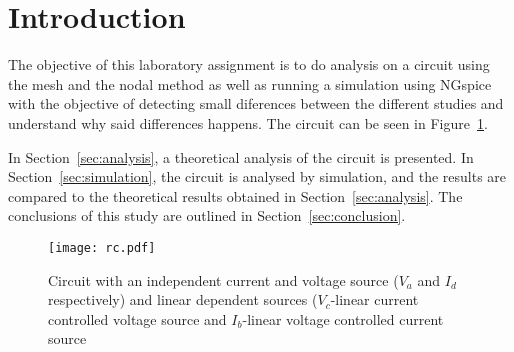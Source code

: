 \section{Introduction}
\label{sec:introduction}

The objective of this laboratory assignment is to do analysis on a circuit using the mesh and the nodal method as well as running a simulation using NGspice with the objective of detecting small diferences between the different studies and understand why said differences happens. The circuit can be seen in Figure~\ref{fig:rc}.

In Section~\ref{sec:analysis}, a theoretical analysis of the circuit is
presented. In Section~\ref{sec:simulation}, the circuit is analysed by
simulation, and the results are compared to the theoretical results obtained in
Section~\ref{sec:analysis}. The conclusions of this study are outlined in
Section~\ref{sec:conclusion}.

\begin{figure}[h] \centering
\texttt{[image: rc.pdf]}
\caption{Circuit with an independent current and voltage source ($V_a$ and $I_d$ respectively) and linear dependent sources ($V_c$-linear current controlled voltage source and $I_b$-linear voltage controlled current source}
\label{fig:rc}
\end{figure}

